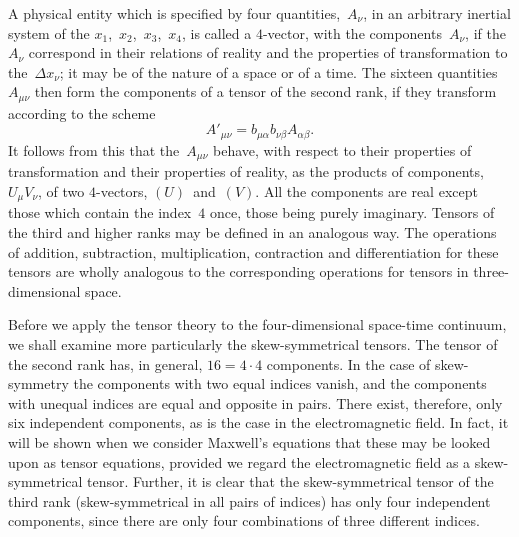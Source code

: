 \documentclass[12pt]{book}[2005/09/16]
\newcommand{\PageSep}[1]{\ignorespaces}
\begin{document}
A physical entity which is specified by four quantities,~$A_{\nu}$,
%
in an arbitrary inertial system of the $x_{1}$,~$x_{2}$,~$x_{3}$,~$x_{4}$, is
called a $4$-vector, with the components~$A_{\nu}$, if the $A_{\nu}$
correspond in their relations of reality and the properties
of transformation to the~$\Delta x_{\nu}$; it may be of the nature of
a space or of a time. The sixteen quantities~$A_{\mu\nu}$ then
form the components of a tensor of the second rank, if
they transform according to the scheme
\[
{A'}_{\mu\nu} = b_{\mu\alpha} b_{\nu\beta} A_{\alpha\beta}.
\]
It follows from this that the~$A_{\mu\nu}$ behave, with respect to
their properties of transformation and their properties
of reality, as the products of components,~$U_{\mu}V_{\nu}$, of two
$4$-vectors, $(U)$~and~$(V)$. All the components are real
except those which contain the index~$4$ once, those being
purely imaginary. Tensors of the third and higher ranks
may be defined in an analogous way. The operations
of addition, subtraction, multiplication, contraction and
differentiation for these tensors are wholly analogous to
the corresponding operations for tensors in three-dimensional
space.

Before we apply the tensor theory to the four-dimensional
space-time continuum, we shall examine more
particularly the skew-symmetrical tensors. The tensor
of the second rank has, in general, $16 = 4·4$ components.
In the case of skew-symmetry the components with two
equal indices vanish, and the components with unequal
indices are equal and opposite in pairs. There exist,
therefore, only six independent components, as is the
case in the electromagnetic field. In fact, it will be shown
\PageSep{44}
when we consider Maxwell's equations that these may
be looked upon as tensor equations, provided we regard
the electromagnetic field as a skew-symmetrical tensor.
Further, it is clear that the skew-symmetrical tensor of
the third rank (skew-symmetrical in all pairs of indices)
has only four independent components, since there are
only four combinations of three different indices.
\end{document}
